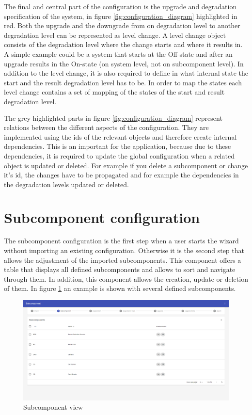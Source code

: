 The final and central part of the configuration is the upgrade and degradation specification of the system, in figure \ref{fig:configuration_diagram} highlighted in red. Both the upgrade and the downgrade from on degradation level to another degradation level can be represented as level change. A level change object consists of the degradation level where the change starts and where it results in. A simple example could be a system that starts at the Off-state and after an upgrade results in the On-state (on system level, not on subcomponent level). In addition to the level change, it is also required to define in what internal state the start and the result degradation level has to be. In order to map the states each level change contains a set of mapping of the states of the start and result degradation level.

The grey highlighted parts in figure \ref{fig:configuration_diagram} represent relations between the different aspects of the configuration. They are implemented using the ids of the relevant objects and therefore create internal dependencies. This is an important for the application, because due to these dependencies, it is required to update the global configuration when a related object is updated or deleted. For example if you delete a subcomponent or change it's id, the changes have to be propagated and for example the dependencies in the degradation levels updated or deleted.

\section{Subcomponent configuration}

The subcomponent configuration is the first step when a user starts the wizard without importing an existing configuration. Otherwise it is the second step that allows the adjustment of the imported subcomponents.
This component offers a table that displays all defined subcomponents and allows to sort and navigate through them. In addition, this component allows the creation, update or deletion of them. In figure \ref{fig:subcomponent_view} an example is shown with several defined subcomponents.

\begin{figure}[ht]
    \centering
    \includegraphics[width=\textwidth]{img/subcomponents_overview.png}
    \caption{Subcomponent view}
    \label{fig:subcomponent_view}
\end{figure}

